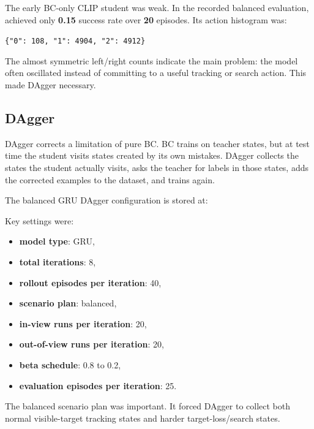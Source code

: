 \documentclass[11pt]{article}
\begin{document}
The early BC-only CLIP student was weak. In the recorded balanced evaluation,
 achieved only \textbf{0.15} success rate
over \textbf{20} episodes. Its action histogram was:

\begin{center}
\texttt{\{"0": 108, "1": 4904, "2": 4912\}}
\end{center}

The almost symmetric left/right counts indicate the main problem: the model
often oscillated instead of committing to a useful tracking or search action.
This made DAgger necessary.

\subsection{DAgger}

DAgger corrects a limitation of pure BC. BC trains on teacher states, but at
test time the student visits states created by its own mistakes. DAgger
collects the states the student actually visits, asks the teacher for labels
in those states, adds the corrected examples to the dataset, and trains again.

The balanced GRU DAgger configuration is stored at:

\begin{center}
\end{center}

Key settings were:

\begin{itemize}
  \item \textbf{model type}: GRU,
  \item \textbf{total iterations}: 8,
  \item \textbf{rollout episodes per iteration}: 40,
  \item \textbf{scenario plan}: balanced,
  \item \textbf{in-view runs per iteration}: 20,
  \item \textbf{out-of-view runs per iteration}: 20,
  \item \textbf{beta schedule}: 0.8 to 0.2,
  \item \textbf{evaluation episodes per iteration}: 25.
\end{itemize}

The balanced scenario plan was important. It forced DAgger to collect both
normal visible-target tracking states and harder target-loss/search states.
\end{document}
